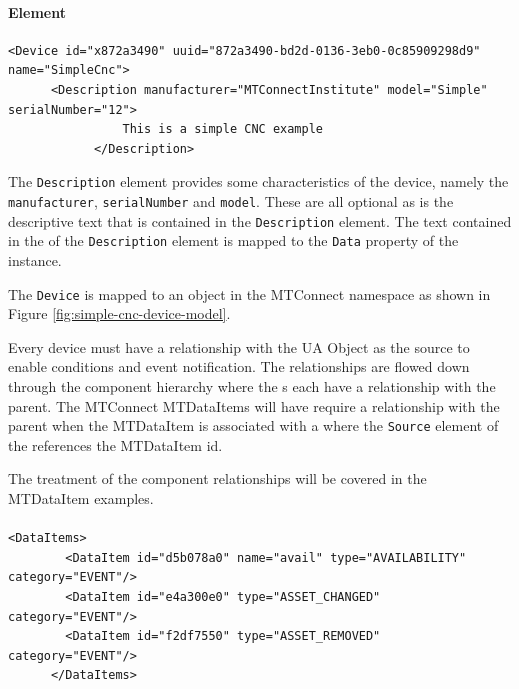 \paragraph{ Element}

\begin{lstlisting}[firstnumber=last,%
    caption={\texttt{Device} Element Mapping},label={lst:device-model-device}]
    <Device id="x872a3490" uuid="872a3490-bd2d-0136-3eb0-0c85909298d9" name="SimpleCnc">
      <Description manufacturer="MTConnectInstitute" model="Simple" serialNumber="12">
				This is a simple CNC example
			</Description>
\end{lstlisting}

The \texttt{Description} element provides some characteristics of the device, namely the \texttt{manufacturer}, \texttt{serialNumber} and \texttt{model}. These are all optional as is the descriptive text that is contained in the \texttt{Description} element. The text contained in the  of the \texttt{Description} element is mapped to the \texttt{Data} property of the  instance.

The \texttt{Device} is mapped to an  object in the MTConnect namespace as shown in Figure \ref{fig:simple-cnc-device-model}.



Every device must have a  relationship with the  UA Object as the source to enable conditions and event notification. The  relationships are flowed down through the component hierarchy where the s each have a  relationship with the parent. The MTConnect \glspl{MTDataItem} will have require a  relationship with the parent  when the \gls{MTDataItem} is associated with a  where the \texttt{Source} element of the  references the \gls{MTDataItem} id. 

The treatment of the component relationships will be covered in the \gls{MTDataItem} examples.

\paragraph{ }

\begin{lstlisting}[firstnumber=last,%
    caption={Device Data Items},label={lst:device-data-items}]
      <DataItems>
        <DataItem id="d5b078a0" name="avail" type="AVAILABILITY" category="EVENT"/>
        <DataItem id="e4a300e0" type="ASSET_CHANGED" category="EVENT"/>
        <DataItem id="f2df7550" type="ASSET_REMOVED" category="EVENT"/>
      </DataItems>
\end{lstlisting}

